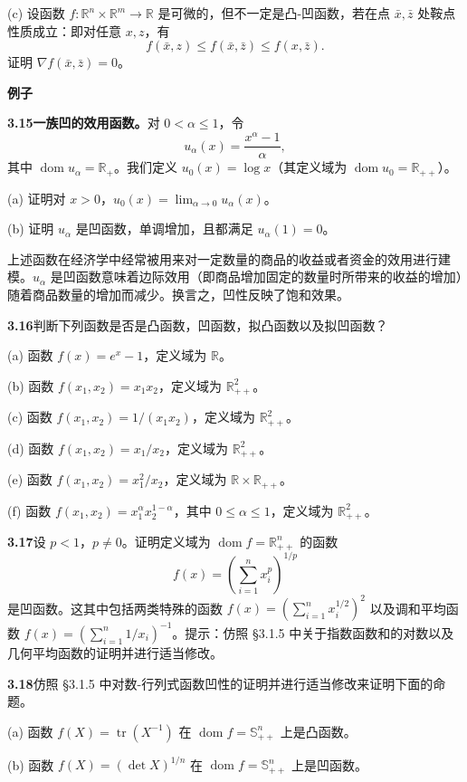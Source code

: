 \documentclass[UTF8,12pt,a4paper,fontset=fandol]{ctexart}
\DeclareMathOperator{\dom}{dom}
\begin{document}
(c) 设函数 $f:\mathbb{R}^n\times\mathbb{R}^m\to\mathbb{R}$ 是可微的，但不一定是凸-凹函数，若在点 $\bar x,\bar z$ 处鞍点性质成立：即对任意 $x,z$，有
\[
f(\bar x,z)\leq f(\bar x,\bar z)\leq f(x,\bar z).
\]
证明 $\nabla f(\bar x,\bar z)=0$。

\noindent\textbf{例子}

\noindent\textbf{3.15\quad 一族凹的效用函数。}\quad 对 $0<\alpha\leq1$，令
\[
u_\alpha(x)=\frac{x^\alpha-1}{\alpha},
\]
其中 $\dom u_\alpha=\mathbb{R}_+$。我们定义 $u_0(x)=\log x$（其定义域为 $\dom u_0=\mathbb{R}_{++}$）。

(a) 证明对 $x>0$，$u_0(x)=\lim_{\alpha\to0}u_\alpha(x)$。

(b) 证明 $u_\alpha$ 是凹函数，单调增加，且都满足 $u_\alpha(1)=0$。

上述函数在经济学中经常被用来对一定数量的商品的收益或者资金的效用进行建模。$u_\alpha$ 是凹函数意味着边际效用（即商品增加固定的数量时所带来的收益的增加）随着商品数量的增加而减少。换言之，凹性反映了饱和效果。

\noindent\textbf{3.16}\quad 判断下列函数是否是凸函数，凹函数，拟凸函数以及拟凹函数？

(a) 函数 $f(x)=e^x-1$，定义域为 $\mathbb{R}$。

(b) 函数 $f(x_1,x_2)=x_1x_2$，定义域为 $\mathbb{R}_{++}^2$。

(c) 函数 $f(x_1,x_2)=1/(x_1x_2)$，定义域为 $\mathbb{R}_{++}^2$。

(d) 函数 $f(x_1,x_2)=x_1/x_2$，定义域为 $\mathbb{R}_{++}^2$。

(e) 函数 $f(x_1,x_2)=x_1^2/x_2$，定义域为 $\mathbb{R}\times\mathbb{R}_{++}$。

(f) 函数 $f(x_1,x_2)=x_1^\alpha x_2^{1-\alpha}$，其中 $0\leq\alpha\leq1$，定义域为 $\mathbb{R}_{++}^2$。

\noindent\textbf{3.17}\quad 设 $p<1$，$p\neq0$。证明定义域为 $\dom f=\mathbb{R}_{++}^n$ 的函数
\[
f(x)=\left(\sum_{i=1}^n x_i^p\right)^{1/p}
\]
是凹函数。这其中包括两类特殊的函数 $f(x)=\left(\sum_{i=1}^n x_i^{1/2}\right)^2$ 以及调和平均函数 $f(x)=\left(\sum_{i=1}^n 1/x_i\right)^{-1}$。提示：仿照 \S3.1.5 中关于指数函数和的对数以及几何平均函数的证明并进行适当修改。

\noindent\textbf{3.18}\quad 仿照 \S3.1.5 中对数-行列式函数凹性的证明并进行适当修改来证明下面的命题。

(a) 函数 $f(X)=\operatorname{tr}(X^{-1})$ 在 $\dom f=\mathbb{S}_{++}^n$ 上是凸函数。

(b) 函数 $f(X)=(\det X)^{1/n}$ 在 $\dom f=\mathbb{S}_{++}^n$ 上是凹函数。
\end{document}
